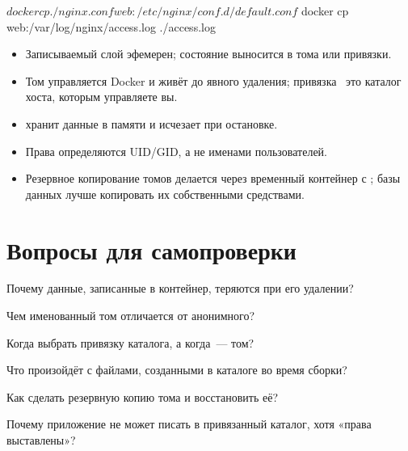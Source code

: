 \begin{code}[language=bash]
$ docker cp ./nginx.conf web:/etc/nginx/conf.d/default.conf
$ docker cp web:/var/log/nginx/access.log ./access.log
\end{code}

\begin{summarybox}
\begin{itemize}
  \item Записываемый слой эфемерен; состояние выносится в тома
        или привязки.
  \item Том управляется Docker и живёт до явного удаления; привязка~
        это каталог хоста, которым управляете вы.
  \item {} хранит данные в памяти и исчезает при остановке.
  \item Права определяются UID/GID, а не именами пользователей.
  \item Резервное копирование томов делается через временный контейнер
        с ; базы данных лучше копировать их собственными
        средствами.
\end{itemize}
\end{summarybox}

\section*{Вопросы для самопроверки}
\begin{selfcheck}
  \item Почему данные, записанные в контейнер, теряются при его удалении?
  \item Чем именованный том отличается от анонимного?
  \item Когда выбрать привязку каталога, а когда~--- том?
  \item Что произойдёт с файлами, созданными в каталоге 
        во время сборки?
  \item Как сделать резервную копию тома и восстановить её?
  \item Почему приложение не может писать в привязанный каталог,
        хотя «права выставлены»?
\end{selfcheck}
